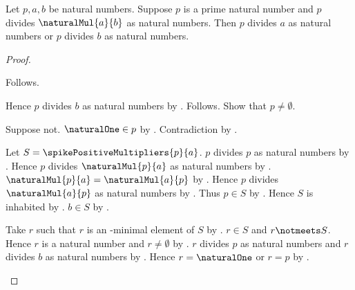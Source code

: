 \begin{theorem}\label{spike15_prime_divides_natural_product}
    Let $p,a,b$ be natural numbers.
    Suppose $p$ is a prime natural number and
        $p$ divides $\naturalMul{a}{b}$ as natural numbers.
    Then $p$ divides $a$ as natural numbers or
        $p$ divides $b$ as natural numbers.
\end{theorem}
\begin{proof}
    \begin{byCase}
            Follows.
            \begin{byCase}
                    Hence $p$ divides $b$ as natural numbers
                        by .
                    Follows.
                    Show that $p\neq\emptyset$.
                    \begin{subproof}
                        Suppose not.
                        $\naturalOne\in p$
                            by .
                        Contradiction by .
                    \end{subproof}

                    Let $S=\spikePositiveMultipliers{p}{a}$.
                    $p$ divides $p$ as natural numbers
                        by .
                    Hence $p$ divides $\naturalMul{p}{a}$
                        as natural numbers
                        by .
                    $\naturalMul{p}{a}=\naturalMul{a}{p}$
                        by .
                    Hence $p$ divides $\naturalMul{a}{p}$
                        as natural numbers by \auto.
                    Thus $p\in S$
                        by .
                    Hence $S$ is inhabited by \auto.
                    $b\in S$ by
                        .

                    Take $r$ such that $r$ is an \in-minimal element of $S$
                        by .
                    $r\in S$ and $r\notmeets S$.
                    Hence $r$ is a natural number and $r\neq\emptyset$
                        by .
                    $r$ divides $p$ as natural numbers and
                        $r$ divides $b$ as natural numbers
                        by .
                    Hence $r=\naturalOne$ or $r=p$
                        by .


\end{byCase}
\end{byCase}
\end{proof}
